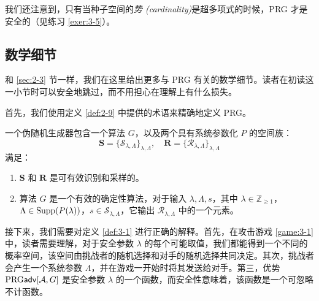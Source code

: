 我们还注意到，只有当种子空间的\emph{势 (cardinality)}是超多项式的时候，PRG 才是安全的（见练习 \ref{exer:3-5}）。

\subsection{数学细节}

和 \ref{sec:2-3} 节一样，我们在这里给出更多与 PRG 有关的数学细节。读者在初读这一小节时可以安全地跳过，而不用担心在理解上有什么损失。

首先，我们使用定义 \ref{def:2-9} 中提供的术语来精确地定义 PRG。

\begin{definition}[伪随机生成器]
一个伪随机生成器包含一个算法 $G$，以及两个具有系统参数化 $P$ 的空间族：
\[
\mathbf{S}=\{\mathcal{S}_{\lambda,\Lambda}\}_{\lambda,\Lambda},\quad
\mathbf{R}=\{\mathcal{R}_{\lambda,\Lambda}\}_{\lambda,\Lambda}
\]
满足：
\begin{enumerate}
	\item $\mathbf{S}$ 和 $\mathbf{R}$ 是可有效识别和采样的。
	\item 算法 $G$ 是一个有效的确定性算法，对于输入 $\lambda,\Lambda,s$，其中 $\lambda\in\mathbb{Z}_{\geq1}$，$\Lambda\in{\rm Supp}(P(\lambda))$，$s\in\mathcal{S}_{\lambda,\Lambda}$，它输出 $\mathcal{R}_{\lambda,\Lambda}$ 中的一个元素。
\end{enumerate}
\end{definition}

接下来，我们需要对定义 \ref{def:3-1} 进行正确的解释。首先，在攻击游戏 \ref{game:3-1} 中，读者需要理解，对于安全参数 $\lambda$ 的每个可能取值，我们都能得到一个不同的概率空间，该空间由挑战者的随机选择和对手的随机选择共同决定。其次，挑战者会产生一个系统参数 $\Lambda$，并在游戏一开始时将其发送给对手。第三，优势 ${\rm PRG\mathsf{adv}}[\mathcal{A},G]$ 是安全参数 $\lambda$ 的一个函数，而安全性意味着，该函数是一个可忽略不计函数。
